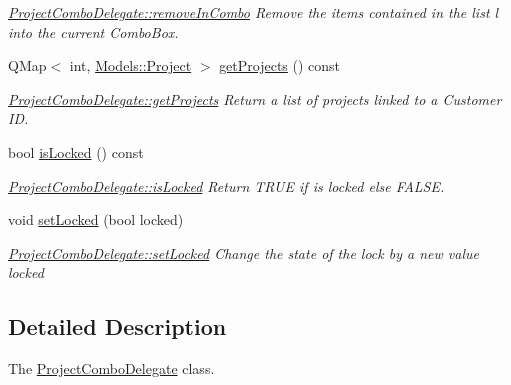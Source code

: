 \begin{DoxyCompactItemize}
\begin{DoxyCompactList}\small\item\em \hyperlink{classGui_1_1Widgets_1_1Delegates_1_1ProjectComboDelegate_a2c063b4b737ff627696a1b247860cc4b}{Project\-Combo\-Delegate\-::remove\-In\-Combo} Remove the items contained in the list {\itshape l} into the current Combo\-Box. \end{DoxyCompactList}\item 
Q\-Map$<$ int, \hyperlink{classModels_1_1Project}{Models\-::\-Project} $>$ \hyperlink{classGui_1_1Widgets_1_1Delegates_1_1ProjectComboDelegate_a63d0ef3a5179d72ab577f359c8f7a6fa}{get\-Projects} () const 
\begin{DoxyCompactList}\small\item\em \hyperlink{classGui_1_1Widgets_1_1Delegates_1_1ProjectComboDelegate_a63d0ef3a5179d72ab577f359c8f7a6fa}{Project\-Combo\-Delegate\-::get\-Projects} Return a list of projects linked to a Customer I\-D. \end{DoxyCompactList}\item 
bool \hyperlink{classGui_1_1Widgets_1_1Delegates_1_1ProjectComboDelegate_a4a6f72086d21f27d7bede82e17a77501}{is\-Locked} () const 
\begin{DoxyCompactList}\small\item\em \hyperlink{classGui_1_1Widgets_1_1Delegates_1_1ProjectComboDelegate_a4a6f72086d21f27d7bede82e17a77501}{Project\-Combo\-Delegate\-::is\-Locked} Return T\-R\-U\-E if is locked else F\-A\-L\-S\-E. \end{DoxyCompactList}\item 
void \hyperlink{classGui_1_1Widgets_1_1Delegates_1_1ProjectComboDelegate_a314629bddab90168c13ca11370c1968f}{set\-Locked} (bool locked)
\begin{DoxyCompactList}\small\item\em \hyperlink{classGui_1_1Widgets_1_1Delegates_1_1ProjectComboDelegate_a314629bddab90168c13ca11370c1968f}{Project\-Combo\-Delegate\-::set\-Locked} Change the state of the lock by a new value {\itshape locked} \end{DoxyCompactList}\end{DoxyCompactItemize}


\subsection{Detailed Description}
The \hyperlink{classGui_1_1Widgets_1_1Delegates_1_1ProjectComboDelegate}{Project\-Combo\-Delegate} class. 

